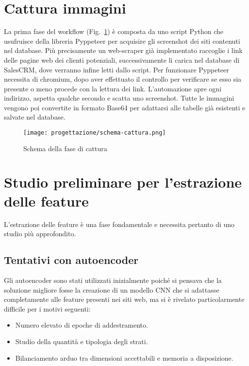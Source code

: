 \section{Cattura immagini}
La prima fase del workflow (Fig.~\ref{fig:schema-cattura}) è composta da uno script Python che usufruisce della libreria Pyppeteer per acquisire gli screenshot dei siti contenuti nel database.
Più precisamente un web-scraper già implementato raccoglie i link delle pagine web dei clienti potenziali, successivamente li carica nel database di SalesCRM, dove verranno infine letti dallo script.
Per funzionare Pyppeteer necessita di chromium, dopo aver effettuato il controllo per verificare se esso sia presente o meno procede con la lettura dei link. 
L'automazione apre ogni indirizzo, aspetta qualche secondo e scatta uno screenshot. 
Tutte le immagini vengono poi convertite in formato Base64 per adattarsi alle tabelle già esistenti e salvate nel database.

\begin{figure}[!h] 
  \centering 
  \texttt{[image: progettazione/schema-cattura.png]} 
  \caption{Schema della fase di cattura}
  \label{fig:schema-cattura}
\end{figure}

\newpage

\section{Studio preliminare per l'estrazione delle feature}
L'estrazione delle feature è una fase fondamentale e necessita pertanto di uno studio più approfondito.

\subsection{Tentativi con autoencoder}
Gli autoencoder sono stati utilizzati inizialmente poiché si pensava che la soluzione migliore fosse la creazione di un modello CNN che si adattasse completamente alle feature presenti nei siti web, ma si è rivelato particolarmente difficile per i motivi seguenti:
\begin{itemize}
  \item Numero elevato di epoche di addestramento.
  \item Studio della quantità e tipologia degli strati.
  \item Bilanciamento arduo tra dimensioni accettabili e memoria a disposizione.
\end{itemize}

